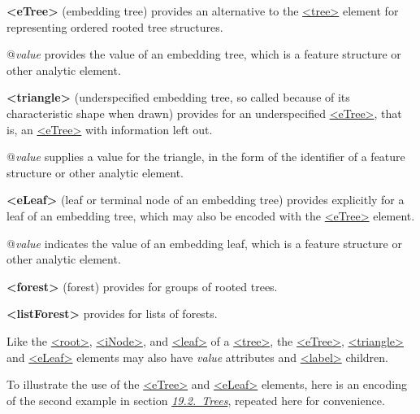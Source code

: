 \begin{sansreflist}
  
\item [\textbf{<eTree>}] (embedding tree) provides an alternative to the \hyperref[TEI.tree]{<tree>} element for representing ordered rooted tree structures.\hfil\\[-10pt]\begin{sansreflist}
    \item[@{\itshape value}]
  provides the value of an embedding tree, which is a feature structure or other analytic element.
\end{sansreflist}  
\item [\textbf{<triangle>}] (underspecified embedding tree, so called because of its characteristic shape when drawn) provides for an underspecified \hyperref[TEI.eTree]{<eTree>}, that is, an \hyperref[TEI.eTree]{<eTree>} with information left out.\hfil\\[-10pt]\begin{sansreflist}
    \item[@{\itshape value}]
  supplies a value for the triangle, in the form of the identifier of a feature structure or other analytic element.
\end{sansreflist}  
\item [\textbf{<eLeaf>}] (leaf or terminal node of an embedding tree) provides explicitly for a leaf of an embedding tree, which may also be encoded with the \hyperref[TEI.eTree]{<eTree>} element.\hfil\\[-10pt]\begin{sansreflist}
    \item[@{\itshape value}]
  indicates the value of an embedding leaf, which is a feature structure or other analytic element.
\end{sansreflist}  
\item [\textbf{<forest>}] (forest) provides for groups of rooted trees.
\item [\textbf{<listForest>}] provides for lists of forests.
\end{sansreflist}
\par
Like the \hyperref[TEI.root]{<root>}, \hyperref[TEI.iNode]{<iNode>}, and \hyperref[TEI.leaf]{<leaf>} of a \hyperref[TEI.tree]{<tree>}, the \hyperref[TEI.eTree]{<eTree>}, \hyperref[TEI.triangle]{<triangle>} and \hyperref[TEI.eLeaf]{<eLeaf>} elements may also have {\itshape value} attributes and \hyperref[TEI.label]{<label>} children.\par
To illustrate the use of the \hyperref[TEI.eTree]{<eTree>} and \hyperref[TEI.eLeaf]{<eLeaf>} elements, here is an encoding of the second example in section \textit{\hyperref[GDTR]{19.2.\ Trees}}, repeated here for convenience.\par
